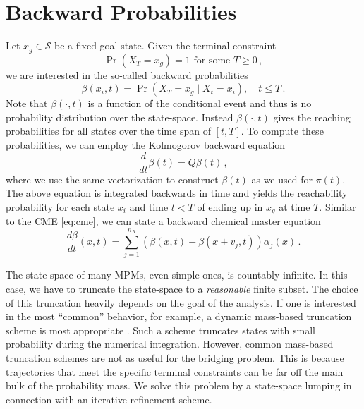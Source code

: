\section{Backward Probabilities}
Let $x_g\in \mathcal{S}$ be a fixed goal state.
Given the terminal constraint
\begin{equation*}
  \Pr(X_T=x_g)=1 \text{ for some }T\geq 0\,,
\end{equation*}
we are interested in the so-called backward probabilities
\begin{equation}\label{eq:back_probs}
  \beta(x_i, t) = \Pr(X_T=x_g\mid X_t = x_i),\quad t\leq T\,.
\end{equation}
Note that $\beta(\cdot, t)$ is a function of the conditional event
and thus is no probability distribution over the state-space.
Instead $\beta(\cdot, t)$ gives the reaching probabilities for all
states over the
time span of $[t, T]$.
To compute these probabilities, we can employ the Kolmogorov backward equation
\begin{equation}\label{eq:backward}
  \frac{d}{dt}\beta(t) = Q\beta(t)\,,
\end{equation}
where we use the same vectorization to construct $\beta(t)$ as we used
for $\pi(t)$.
The above equation is integrated backwards in time and yields the reachability
probability for each state $x_i$ and time $t<T$ of ending up in $x_g$
at time $T$.
Similar to the \ac{CME} \eqref{eq:cme}, we can state a backward
chemical master equation
\begin{equation}\label{eq:bcme}
  \frac{d\beta}{dt}({x}, t) =
  \sum_{j=1}^{n_R}\left(
    \beta( x,t) - \beta( x+ v_j,t)
  \right)\alpha_j({x})\,.
\end{equation}

The state-space of many \acp{MPM}, even simple ones, is countably infinite.
In this case, we have to truncate the state-space to a \emph{reasonable}
finite subset.
The choice of this truncation heavily depends on the goal of the
analysis.
If one is interested in the most ``common'' behavior, for example,
a dynamic mass-based truncation scheme is most appropriate
\parencite{mikeev2019approximate}.
Such a scheme truncates states with small probability during the
numerical integration.
However, common mass-based truncation schemes are not as useful for the
bridging problem. This is because trajectories that meet
the specific terminal constraints can be far off the main bulk of the
probability mass.
We solve this problem by a state-space lumping in connection with an
iterative refinement scheme.

